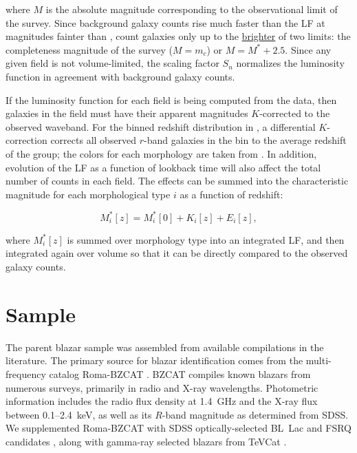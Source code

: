 \documentclass{emulateapj}
\begin{document}
\noindent where $M$ is the absolute magnitude corresponding to the observational limit of the survey. Since background galaxy counts rise much faster than the LF at magnitudes fainter than \mstar, \citet{yee87} count galaxies only up to the \underline{brighter} of two limits: the completeness magnitude of the survey ($M=m_c$) or $M=M^* + 2.5$. Since any given field is not volume-limited, the scaling factor $S_n$ normalizes the luminosity function in agreement with background galaxy counts. 

If the luminosity function for each field is being computed from the data, then galaxies in the field must have their apparent magnitudes $K$-corrected to the observed waveband. For the binned redshift distribution in \citet{yee87}, a differential $K$-correction corrects all observed $r$-band galaxies in the bin to the average redshift of the group; the colors for each morphology are taken from \citet{seb86}. In addition, evolution of the LF as a function of lookback time will also affect the total number of counts in each field. The effects can be summed into the characteristic magnitude for each morphological type $i$ as a function of redshift:

\begin{equation}
\label{eqn:mstar_morph}
M_i^*[z] = M_i^*[0] + K_i[z] + E_i[z],
\end{equation}

\noindent where $M_i^*[z]$ is summed over morphology type into an integrated LF, and then integrated again over volume so that it can be directly compared to the observed galaxy counts. 


\section{Sample}\label{sec:sample}

The parent blazar sample was assembled from available compilations in the literature. The primary source for blazar identification comes from the multi-frequency catalog Roma-BZCAT \citep{mas09}. BZCAT compiles known blazars from numerous surveys, primarily in radio and X-ray wavelengths. Photometric information includes the radio flux density at 1.4~GHz and the X-ray flux between 0.1--2.4~keV, as well as its $R$-band magnitude as determined from SDSS. We supplemented Roma-BZCAT with SDSS optically-selected BL~Lac \citep{plo10} and FSRQ candidates \citep{che09a}, along with gamma-ray selected blazars from TeVCat \citep{hor08}. 
\end{document}
